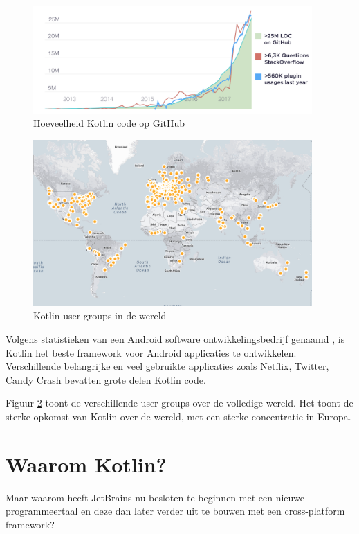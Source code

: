 \begin{figure} [ht]
	\centering
	\includegraphics[width=0.95\textwidth]{img/KotlinAdoption.png}
	\caption{Hoeveelheid Kotlin code op GitHub \cite{JetBrains12}}
	\label{fig:kotlingithub}
\end{figure}

\begin{figure} [ht]
	\centering
	\includegraphics[width=0.95\textwidth]{img/KUGmap.png}
	\caption{Kotlin user groups in de wereld \cite{JetBrains12}}
	\label{fig:usergroups}
\end{figure}

Volgens statistieken van een Android software ontwikkelingsbedrijf genaamd \textcite{AppBrain}, is Kotlin het beste framework voor Android applicaties te ontwikkelen. Verschillende belangrijke en veel gebruikte applicaties zoals Netflix, Twitter, Candy Crash bevatten grote delen Kotlin code.

Figuur \ref{fig:usergroups} toont de verschillende user groups over de volledige wereld. Het toont de sterke opkomst van Kotlin over de wereld, met een sterke concentratie in Europa.

\section{Waarom Kotlin?}
\label{sec:whykotlin}
Maar waarom heeft JetBrains nu besloten te beginnen met een nieuwe programmeertaal en deze dan later verder uit te bouwen met een cross-platform framework?

